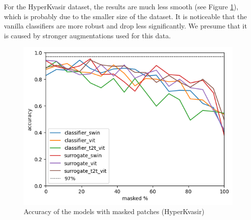 \documentclass[en]{pracamgr}
\begin{document}
For the HyperKvasir dataset, the results are much less smooth (see Figure \ref{gastro_masked_accuracy}), which is probably due to the smaller size of the dataset. It is noticeable that the vanilla classifiers are more robust and drop less significantly. We presume that it is caused by stronger augmentations used for this data.



\begin{figure}[H]
\centering
\includegraphics[scale=0.8]{./images/gastro_masked_accuracy.png}
\caption{Accuracy of the models with masked patches (HyperKvasir)}
\label{gastro_masked_accuracy}
\end{figure}
\end{document}
